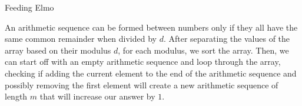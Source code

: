 \begin{tutorial}{Feeding Elmo}

An arithmetic sequence can be formed between numbers only if they all have the same common remainder when divided by $d$. After separating the values of the array based on their modulus $d$, for each modulus, we sort the array. Then, we can start off with an empty arithmetic sequence and loop through the array, checking if adding the current element to the end of the arithmetic sequence and possibly removing the first element will create a new arithmetic sequence of length $m$ that will increase our answer by $1$.

\end{tutorial}
